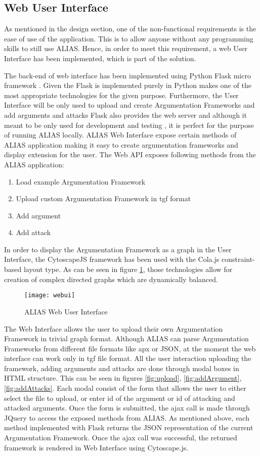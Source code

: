 \subsection{Web User Interface}
As mentioned in the design section, one of the non-functional requirements is the ease of use of the application. This is to allow anyone without any programming skills to still use ALIAS. Hence, in order to meet this requirement, a web User Interface has been implemented, which is part of the solution.

The back-end of web interface has been implemented using Python Flask micro framework \citep{flaskDocs}. Given the Flask is implemented purely in Python makes one of the most appropriate technologies for the given purpose. Furthermore, the User Interface will be only used to upload and create Argumentation Frameworks and add arguments and attacks Flask also provides the web server and although it meant to be only used for development and testing \citep{flaskBook}, it is perfect for the purpose of running ALIAS locally. ALIAS Web Interface expose certain methods of ALIAS application making it easy to create argumentation frameworks and display extension for the user. The Web API exposes following methods from the ALIAS application:
\begin{enumerate}
	\item Load example Argumentation Framework
	\item Upload custom Argumentation Framework in tgf format
	\item Add argument
	\item Add attack
\end{enumerate}

In order to display the Argumentation Framework as a graph in the User Interface, the CytoscapeJS \citep{cytoscapejs} framework has been used with the Cola.js constraint-based layout type. As can be seen in figure \ref{fig:webUi}, those technologies allow for creation of complex directed graphs which are dynamically balanced.

\begin{figure}
	\texttt{[image: webui]}
	\caption{ALIAS Web User Interface}
	\label{fig:webUi}
\end{figure}

The Web Interface allows the user to upload their own Argumentation Framework in trivial graph format. Although ALIAS can parse Argumentation Frameworks from different file formats like apx or JSON, at the moment the web interface can work only in tgf file format. All the user interaction uploading the framework, adding arguments and attacks are done through modal boxes in HTML structure. This can be seen in figures \ref{fig:upload}, \ref{fig:addArgument}, \ref{fig:addAttacks}. Each modal consist of the form that allows the user to either select the file to upload, or enter id of the argument or id of attacking and attacked arguments. Once the form is submitted, the ajax call is made through JQuery to access the exposed methods from ALIAS. As mentioned above, each method implemented with Flask returns the JSON representation of the current Argumentation Framework. Once the ajax call was successful, the returned framework is rendered in Web Interface using Cytoscape.js.

